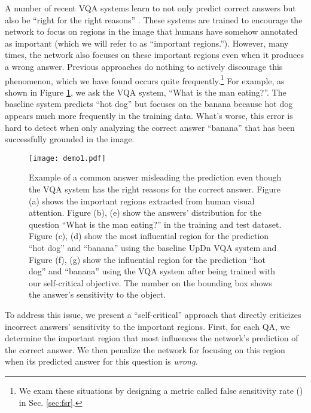 \documentclass{article}
\begin{document}
A number of recent VQA systems \cite{trott2017interpretable,zhang2019interpretable,selvaraju2019taking,qiao2018exploring} learn to not only predict correct answers but also be ``right for the right reasons'' \cite{ross2017right,selvaraju2019taking}. These systems are trained to encourage the network to focus on regions in the image that humans have somehow annotated as important (which we will refer to as ``important regions.''). However, many times, the network also focuses on these important regions even when it produces a wrong answer.  Previous approaches do nothing to actively discourage this phenomenon, which we have found occurs quite frequently.\footnote{We exam these situations by designing a metric called false sensitivity rate () in Sec. \ref{sec:fsr}.}   
For example, as shown in Figure \ref{fig:demo}, we ask the VQA system, ``What is the man eating?''. The baseline system predicts ``hot dog'' but focuses on the banana because hot dog appears much more frequently in the training data. What's worse, this error is hard to detect when only analyzing the correct answer ``banana'' that has been successfully grounded in the image.


\begin{figure}[!t]
    \centering
    \texttt{[image: demo1.pdf]}
    \caption{Example of a common answer misleading the prediction even though the VQA system has the right reasons for the correct answer. Figure (a) shows the important regions extracted from human visual attention. Figure (b), (e) show the answers' distribution for the question ``What is the man eating?'' in the training and test dataset.  Figure (c), (d) show the most influential region for the prediction ``hot dog'' and ``banana'' using the baseline UpDn VQA system and Figure (f), (g) show the influential region for the prediction ``hot dog'' and ``banana'' using the VQA system after being trained with our self-critical objective. The number on the bounding box shows the answer's sensitivity to the object.}
    \label{fig:demo}
\end{figure}

To address this issue, we present a ``self-critical'' approach that directly criticizes incorrect answers' sensitivity to the important regions.  First, for each QA, we determine the important region that most influences the network's prediction of the correct answer. We then penalize the network for focusing on this region when its predicted answer for this question is {\it wrong}.  
\end{document}
